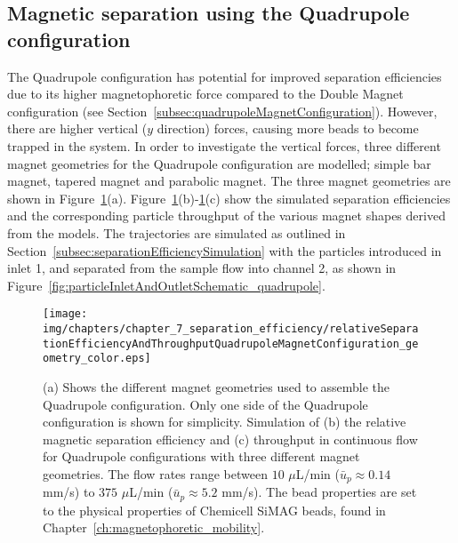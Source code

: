 \subsection{Magnetic separation using the Quadrupole configuration}\label{subsec:continuousMagneticSeparationUsingTheQuadrupoleConfiguration}
The Quadrupole configuration has potential for improved separation efficiencies due to its higher magnetophoretic force compared to the Double Magnet configuration (see Section~\ref{subsec:quadrupoleMagnetConfiguration}). However, there are higher vertical ($y$ direction) forces, causing more beads to become trapped in the system. In order to investigate the vertical forces, three different magnet geometries for the Quadrupole configuration are modelled; simple bar magnet, tapered magnet and parabolic magnet. The three magnet geometries  are shown in Figure~\ref{fig:relativeSeparationEfficiencyAndParticleThroughputQuadrupoleMagnetConfigurationMagnetGeometries}(a). Figure~\ref{fig:relativeSeparationEfficiencyAndParticleThroughputQuadrupoleMagnetConfigurationMagnetGeometries}(b)-\ref{fig:relativeSeparationEfficiencyAndParticleThroughputQuadrupoleMagnetConfigurationMagnetGeometries}(c) show the simulated separation efficiencies and the corresponding particle throughput of the various magnet shapes derived from the models. The trajectories are simulated as outlined in Section~\ref{subsec:separationEfficiencySimulation} with the particles introduced in inlet 1, and separated from the sample flow into channel 2, as shown in Figure~\ref{fig:particleInletAndOutletSchematic_quadrupole}.

\begin{figure}[htb!]
    \centering
    \texttt{[image: img/chapters/chapter\_7\_separation\_efficiency/relativeSeparationEfficiencyAndThroughputQuadrupoleMagnetConfiguration\_geometry\_color.eps]}
        \caption[Relative magnetic separation efficiency and throughput for different flow rates using different magnet geometries for the Quadrupole configuration]{(a) Shows the different magnet geometries used to assemble the Quadrupole configuration. Only one side of the Quadrupole configuration is shown for simplicity. Simulation of (b) the relative magnetic separation efficiency and (c) throughput in continuous flow for Quadrupole configurations with three different magnet geometries. The flow rates range between $10$ $\mu$L/min ($\bar{u}_{p}\approx0.14$ mm/s) to $375$ $\mu$L/min ($\bar{u}_{p}\approx5.2$ mm/s). The bead properties are set to the physical properties of Chemicell SiMAG beads, found in Chapter~\ref{ch:magnetophoretic_mobility}.}
        \label{fig:relativeSeparationEfficiencyAndParticleThroughputQuadrupoleMagnetConfigurationMagnetGeometries}
\end{figure}

